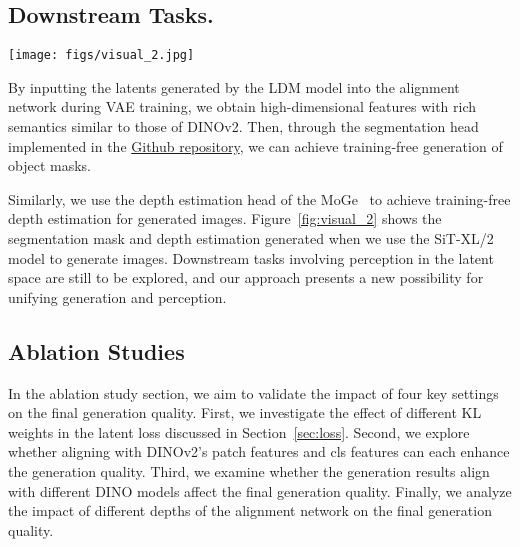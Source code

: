 \subsection{Downstream Tasks.}
\begin{figure*}
    \centering
    \texttt{[image: figs/visual\_2.jpg]}
    \vspace{-1em}
    \caption{\textbf{Training-free Downstream Tasks on Latents.} The diffusion model trained in the representation-aligned latent space naturally possesses stronger semantics, enabling more downstream tasks on latents. The latents generated by diffusion can obtain semantic features through the alignment network used during VAE training, and then multiple modalities of output can be achieved through the corresponding task heads. The first row displays the segmentation results, while the second row shows the depth estimation results.}
    \label{fig:visual_2}
\end{figure*}


By inputting the latents generated by the LDM model into the alignment network during VAE training, we obtain high-dimensional features with rich semantics similar to those of DINOv2. Then, through the segmentation head implemented in the \href{https://github.com/itsprakhar/Downstream-Dinov2}{Github repository}, we can achieve training-free generation of object masks.

Similarly, we use the depth estimation head of the MoGe~\cite{wang2024moge} to achieve training-free depth estimation for generated images. Figure~\ref{fig:visual_2} shows the segmentation mask and depth estimation generated when we use the SiT-XL/2 model to generate images. Downstream tasks involving perception in the latent space are still to be explored, and our approach presents a new possibility for unifying generation and perception.


\subsection{Ablation Studies}
\label{sec:kl analysis}
In the ablation study section, we aim to validate the impact of four key settings on the final generation quality. First, we investigate the effect of different KL weights in the latent loss discussed in Section~\ref{sec:loss}. Second, we explore whether aligning with DINOv2's patch features and cls features can each enhance the generation quality. Third, we examine whether the generation results align with different DINO models affect the final generation quality. Finally, we analyze the impact of different depths of the alignment network on the final generation quality.

